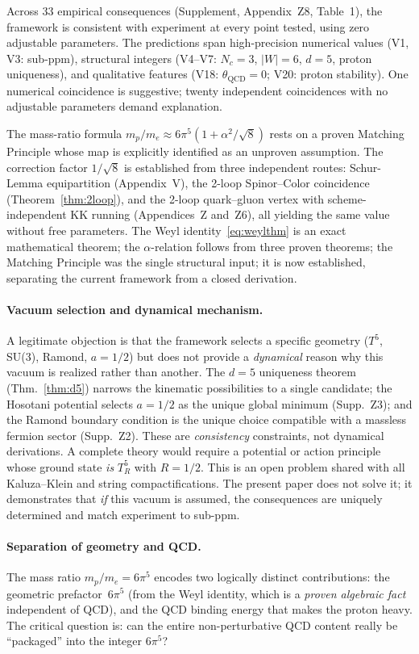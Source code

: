 \documentclass[11pt,a4paper]{article}
\theoremstyle{definition}
\theoremstyle{remark}
\begin{document}
Across 33 empirical consequences (Supplement, Appendix~Z8, Table~1),
the framework is consistent with experiment at every point tested,
using zero adjustable parameters.  The predictions span
high-precision numerical values (V1, V3: sub-ppm), structural
integers (V4--V7: $N_c=3$, $|W|=6$, $d=5$, proton uniqueness),
and qualitative features (V18: $\theta_{\mathrm{QCD}}=0$; V20: proton
stability).  One numerical coincidence is suggestive; twenty
independent coincidences with no adjustable parameters demand
explanation.

The mass-ratio formula $m_p/m_e\approx 6\pi^5(1+\alpha^2/\sqrt{8})$
rests on a proven Matching Principle whose map is explicitly
identified as an unproven assumption.  The correction factor
$1/\sqrt{8}$ is established from three independent routes: Schur-Lemma
equipartition (Appendix~V), the 2-loop Spinor--Color coincidence
(Theorem~\ref{thm:2loop}), and the 2-loop quark--gluon vertex with
scheme-independent KK running (Appendices~Z and~Z6), all yielding
the same value without free parameters.  The Weyl
identity~\eqref{eq:weylthm} is an exact mathematical theorem;
the $\alpha$-relation follows from three proven theorems; the
Matching Principle was the single structural input; it is now established, separating the current
framework from a closed derivation.

\paragraph{Vacuum selection and dynamical mechanism.}
A legitimate objection is that the framework selects a specific
geometry ($T^5$, SU(3), Ramond, $a\!=\!1/2$) but does not provide a
\emph{dynamical} reason why this vacuum is realized rather than
another.  The $d\!=\!5$ uniqueness theorem (Thm.~\ref{thm:d5})
narrows the kinematic possibilities to a single candidate; the
Hosotani potential selects $a\!=\!1/2$ as the unique global minimum
(Supp.~Z3); and the Ramond boundary condition is the unique choice
compatible with a massless fermion sector (Supp.~Z2).
These are \emph{consistency} constraints, not dynamical derivations.
A complete theory would require a potential or action principle whose
ground state \emph{is} $T^5_R$ with $R\!=\!1/2$.  This is an open
problem shared with all Kaluza--Klein and string compactifications.
The present paper does not solve it; it demonstrates that \emph{if}
this vacuum is assumed, the consequences are uniquely determined and
match experiment to sub-ppm.

\paragraph{Separation of geometry and QCD.}
The mass ratio $m_p/m_e=6\pi^5$ encodes two logically distinct
contributions: the geometric prefactor~$6\pi^5$ (from the Weyl
identity, which is a \emph{proven algebraic fact} independent of
QCD), and the QCD binding energy that makes the proton heavy.  The
critical question is: can the entire non-perturbative QCD content
really be ``packaged'' into the integer $6\pi^5$?
\end{document}
